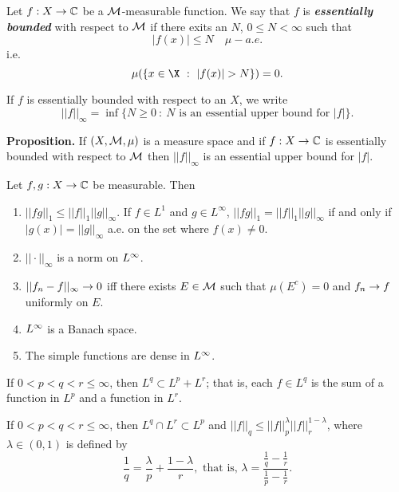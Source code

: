 \vs

\dfn Let $f:X\rightarrow \mathbb{C}$ be a $\mathcal{M}$-measurable function. We say that $f$ is \textbf{\textit{essentially bounded}} with respect to $\mathcal{M}$ if there exits an $N$, $0\leq N < \infty$ such that 
\[|f(x)|\leq N\quad \mu-a.e.\]
i.e.
\[\mu(\{x\in \X\ :\ |f(x)| > N\}) = 0.\]

\vs

\dfn If $f$ is essentially bounded with respect to an $X$, we write
\[||f||_\infty = \inf\{N\geq 0\ :\ N\text{ is an essential upper bound for }|f|\}.\]

\vs

\textbf{Proposition.} If $(X, \mathcal{M}, \mu)$ is a measure space and if $f:X\rightarrow \mathbb{C}$ is essentially bounded with respect to $\mathcal{M}$ then $||f||_\infty$ is an essential upper bound for $|f|$.

\vs

\begin{thm}Let $f,g:X\rightarrow \mathbb{C}$ be measurable. Then
\begin{enumerate}
    \item $||fg||_1 \leq ||f||_1||g||_\infty$. If $f\in L^1$ and $g\in L^\infty$, $||fg||_1 = ||f||_1||g||_\infty$ if and only if $|g(x)| = ||g||_\infty$ a.e. on the set where $f(x) \neq 0$.
    \item $||\cdot||_\infty$ is a norm on $L^\infty$.
    \item $||f_n - f||_\infty \rightarrow 0$ iff there exists $E\in \mathcal{M}$ such that $\mu(E^c) = 0$ and $f_n\rightarrow f$ uniformly on $E$.
    \item $L^\infty$ is a Banach space.
    \item The simple functions are dense in $L^\infty$.
\end{enumerate}
\end{thm}

\vs

\begin{prop}
If $0 < p < q < r\leq \infty$, then $L^q\subset L^p + L^r$; that is, each $f\in L^q$ is the sum of a function in $L^p$ and a function in $L^r$.
\end{prop}

\vs

\begin{prop}
If $0 < p < q < r\leq \infty$, then $L^q\cap L^r \subset L^p$ and $||f||_q\leq ||f||^\lambda_p||f||^{1-\lambda}_r$, where $\lambda\in (0,1)$ is defined by
\[\frac{1}{q} = \frac{\lambda}{p} + \frac{1 - \lambda}{r},\text{ that is, } \lambda = \frac{\frac{1}{q} - \frac{1}{r}}{\frac{1}{p} - \frac{1}{r}}.\]
\end{prop}

